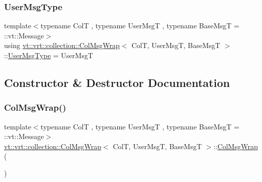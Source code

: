 \subsubsection{\texorpdfstring{User\+Msg\+Type}{UserMsgType}}
{\footnotesize\ttfamily template$<$typename ColT , typename User\+MsgT , typename Base\+MsgT  = \+::vt\+::\+Message$>$ \\
using \hyperlink{structvt_1_1vrt_1_1collection_1_1_col_msg_wrap}{vt\+::vrt\+::collection\+::\+Col\+Msg\+Wrap}$<$ ColT, User\+MsgT, Base\+MsgT $>$\+::\hyperlink{structvt_1_1vrt_1_1collection_1_1_collection_message_ace5b4eaa94f5b209ae321edd6c0b6c19}{User\+Msg\+Type} =  User\+MsgT}



\subsection{Constructor \& Destructor Documentation}
\mbox{\label{structvt_1_1vrt_1_1collection_1_1_col_msg_wrap_a341d1ea25fb9181d1c06ab66df1478f9}} 
\subsubsection{\texorpdfstring{Col\+Msg\+Wrap()}{ColMsgWrap()}\hspace{0.1cm}{\footnotesize\ttfamily [1/3]}}
{\footnotesize\ttfamily template$<$typename ColT , typename User\+MsgT , typename Base\+MsgT  = \+::vt\+::\+Message$>$ \\
\hyperlink{structvt_1_1vrt_1_1collection_1_1_col_msg_wrap}{vt\+::vrt\+::collection\+::\+Col\+Msg\+Wrap}$<$ ColT, User\+MsgT, Base\+MsgT $>$\+::\hyperlink{structvt_1_1vrt_1_1collection_1_1_col_msg_wrap}{Col\+Msg\+Wrap} (\begin{DoxyParamCaption}{ }\end{DoxyParamCaption})\hspace{0.3cm}{\ttfamily [default]}}

\mbox{\label{structvt_1_1vrt_1_1collection_1_1_col_msg_wrap_a9dfc351adf1f31fda9028608d989ce5c}} 
